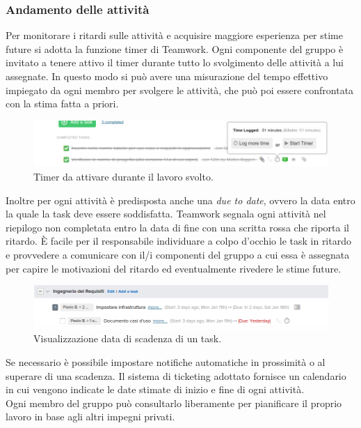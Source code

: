 \documentclass[a4paper]{article}
\begin{document}
			\subsubsection{Andamento delle attività}
				Per monitorare i ritardi sulle attività e acquisire maggiore esperienza per stime future si adotta la 
				funzione timer di Teamwork. Ogni componente del gruppo è invitato a tenere attivo il timer durante 
				tutto lo svolgimento delle attività a lui assegnate. In questo modo si può avere una misurazione del 
				tempo effettivo impiegato da ogni membro per svolgere le attività, che può poi essere confrontata con 
				la stima fatta a priori.
				\begin{figure}[H]
					\centering
					\includegraphics[scale=0.4]{PdP/teamworkTimer}
					\caption{Timer da attivare durante il lavoro svolto.}
				\end{figure}
				Inoltre per ogni attività è predisposta anche una \emph{due to date}, ovvero la data entro la quale la task deve 
				essere soddisfatta. Teamwork segnala ogni attività nel riepilogo non completata entro la data di fine con 
				una scritta rossa che riporta il ritardo. È facile per il responsabile individuare a colpo d'occhio le 
				task in ritardo e provvedere a comunicare con il/i componenti del gruppo a cui essa è assegnata per capire 
				le motivazioni del ritardo ed eventualmente rivedere le stime future.
				\begin{figure}[H]
					\centering
					\includegraphics[scale=0.4]{PdP/teamworkTaskinRitardo}
					\caption{Visualizzazione data di scadenza di un task.}
				\end{figure}
				Se necessario è possibile impostare notifiche automatiche in prossimità o al superare di una scadenza.
				Il sistema di ticketing adottato fornisce un calendario in cui vengono indicate le date stimate di inizio e fine
				di ogni attività.\\
				Ogni membro del gruppo può consultarlo liberamente per pianificare il proprio lavoro in base agli altri
				impegni privati.
				
\end{document}
